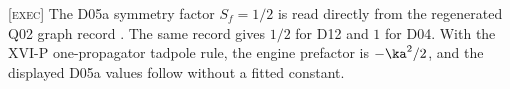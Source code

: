 \textsc{[exec]} The D05a symmetry factor \(S_f=1/2\) is read directly
from the regenerated Q02 graph record
 \cite{CheungQ}.
The same record gives \(1/2\) for D12 and \(1\) for D04.
With the XVI-P one-propagator tadpole rule, the engine prefactor is
\(-\ka^2/2\), and the displayed D05a values follow without a fitted
constant.
